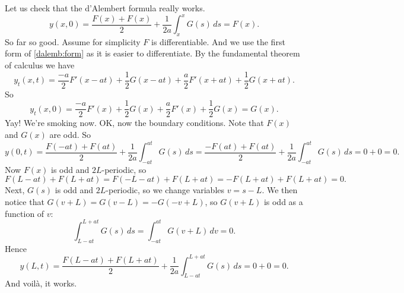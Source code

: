 \documentclass{ximera}
\begin{document}
Let us check that the d'Alembert formula really works.
\begin{equation*}
y(x,0) = \frac{F(x) + F(x)}{2} + \frac{1}{2a} \int_{x}^{x} G(s) \,ds  = F(x) .
\end{equation*}
So far so good.  Assume for simplicity $F$ is differentiable. And we use the first form of \eqref{dalemb:form} as it is easier to differentiate. By the fundamental theorem of calculus we have
\begin{equation*}
    y_t(x,t) = \frac{-a}{2} F'(x-at) + \frac{1}{2} G(x-at) + \frac{a}{2} F'(x+at) + \frac{1}{2} G(x+at) .
\end{equation*}
So
\begin{equation*}
    y_t(x,0) = \frac{-a}{2} F'(x) + \frac{1}{2} G(x) + \frac{a}{2} F'(x) + \frac{1}{2} G(x) = G(x) .
\end{equation*}
Yay!  We're smoking now.  OK\@, now the boundary conditions.  Note that $F(x)$ and $G(x)$ are odd.  So
\begin{equation*}
    y(0,t) =
    \frac{F(-at) + F(at)}{2} + \frac{1}{2a} \int_{-at}^{at} G(s) \,ds =
    \frac{-F(at) + F(at)}{2} + \frac{1}{2a} \int_{-at}^{at} G(s) \,ds = 0 + 0 = 0.
\end{equation*}
Now $F(x)$ is odd and $2L$-periodic, so
\begin{equation*}
    F(L-at)+F(L+at) = F(-L-at)+F(L+at) = -F(L+at)+F(L+at) = 0 .
\end{equation*}
Next, $G(s)$ is odd and $2L$-periodic, so we change variables $v = s-L$.  We then notice that $G(v+L)=G(v-L)=-G(-v+L)$, so $G(v+L)$ is odd as a function of $v$:
\begin{equation*}
    \int_{L-at}^{L+at} G(s)\,ds = \int_{-at}^{at} G(v+L)\,dv = 0 .
\end{equation*}
Hence
\begin{equation*}
    y(L,t) = \frac{F(L-at) + F(L+at)}{2} + \frac{1}{2a} \int_{L-at}^{L+at} G(s) \,ds = 0 + 0  = 0.
\end{equation*}
And voil\`a, it works.
\end{document}

